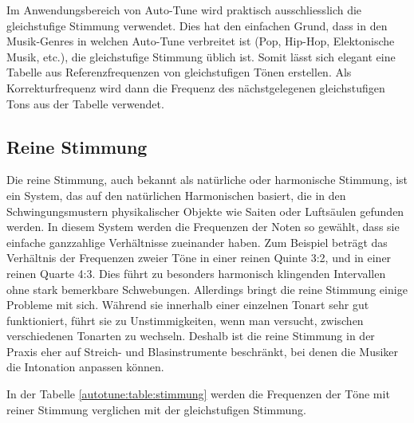 Im Anwendungsbereich von Auto-Tune wird praktisch ausschliesslich die gleichstufige Stimmung verwendet.
Dies hat den einfachen Grund, dass in den Musik-Genres in welchen Auto-Tune verbreitet ist (Pop, Hip-Hop, Elektonische Musik, etc.), die gleichstufige Stimmung üblich ist.
Somit lässt sich elegant eine Tabelle aus Referenzfrequenzen von gleichstufigen Tönen erstellen.
Als Korrekturfrequenz wird dann die Frequenz des nächstgelegenen gleichstufigen Tons aus der Tabelle verwendet.


\subsection{Reine Stimmung
\label{autotune:subsection:reineStimmung}}
Die reine Stimmung, auch bekannt als natürliche oder harmonische Stimmung, ist ein System,
das auf den natürlichen Harmonischen basiert, die in den Schwingungsmustern physikalischer Objekte wie Saiten oder Luftsäulen gefunden werden.
In diesem System werden die Frequenzen der Noten so gewählt, dass sie einfache ganzzahlige Verhältnisse zueinander haben.
Zum Beispiel beträgt das Verhältnis der Frequenzen zweier Töne in einer reinen Quinte 3:2, und in einer reinen Quarte 4:3.
Dies führt zu besonders harmonisch klingenden Intervallen ohne stark bemerkbare Schwebungen.
Allerdings bringt die reine Stimmung einige Probleme mit sich.
Während sie innerhalb einer einzelnen Tonart sehr gut funktioniert, führt sie zu Unstimmigkeiten,
wenn man versucht, zwischen verschiedenen Tonarten zu wechseln.
Deshalb ist die reine Stimmung in der Praxis eher auf Streich- und Blasinstrumente beschränkt,
bei denen die Musiker die Intonation anpassen können.

In der Tabelle \ref{autotune:table:stimmung} werden die Frequenzen der Töne mit reiner Stimmung verglichen mit der gleichstufigen Stimmung.


